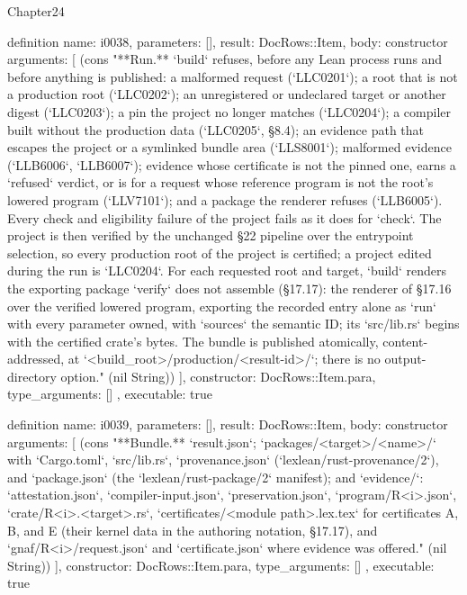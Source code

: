 \begin{lexlean}{Chapter24}
\begin{semanticmodule}
definition{
  name: i0038,
  parameters: [],
  result: DocRows::Item,
  body: constructor{
    arguments: [
      (cons "**Run.** `build` refuses, before any Lean process runs and before anything is published: a malformed request (`LLC0201`); a root that is not a production root (`LLC0202`); an unregistered or undeclared target or another digest (`LLC0203`); a pin the project no longer matches (`LLC0204`); a compiler built without the production data (`LLC0205`, §8.4); an evidence path that escapes the project or a symlinked bundle area (`LLS8001`); malformed evidence (`LLB6006`, `LLB6007`); evidence whose certificate is not the pinned one, earns a `refused` verdict, or is for a request whose reference program is not the root's lowered program (`LLV7101`); and a package the renderer refuses (`LLB6005`). Every check and eligibility failure of the project fails as it does for `check`. The project is then verified by the unchanged §22 pipeline over the entrypoint selection, so every production root of the project is certified; a project edited during the run is `LLC0204`. For each requested root and target, `build` renders the exporting package `verify` does not assemble (§17.17): the renderer of §17.16 over the verified lowered program, exporting the recorded entry alone as `run` with every parameter owned, with `sources` the semantic ID; its `src/lib.rs` begins with the certified crate's bytes. The bundle is published atomically, content-addressed, at `<build_root>/production/<result-id>/`; there is no output-directory option." (nil String))
    ],
    constructor: DocRows::Item.para,
    type_arguments: []
  },
  executable: true
}

definition{
  name: i0039,
  parameters: [],
  result: DocRows::Item,
  body: constructor{
    arguments: [
      (cons "**Bundle.** `result.json`; `packages/<target>/<name>/` with `Cargo.toml`, `src/lib.rs`, `provenance.json` (`lexlean/rust-provenance/2`), and `package.json` (the `lexlean/rust-package/2` manifest); and `evidence/`: `attestation.json`, `compiler-input.json`, `preservation.json`, `program/R<i>.json`, `crate/R<i>.<target>.rs`, `certificates/<module path>.lex.tex` for certificates A, B, and E (their kernel data in the authoring notation, §17.17), and `gnaf/R<i>/request.json` and `certificate.json` where evidence was offered." (nil String))
    ],
    constructor: DocRows::Item.para,
    type_arguments: []
  },
  executable: true
}


\end{semanticmodule}
\end{lexlean}
